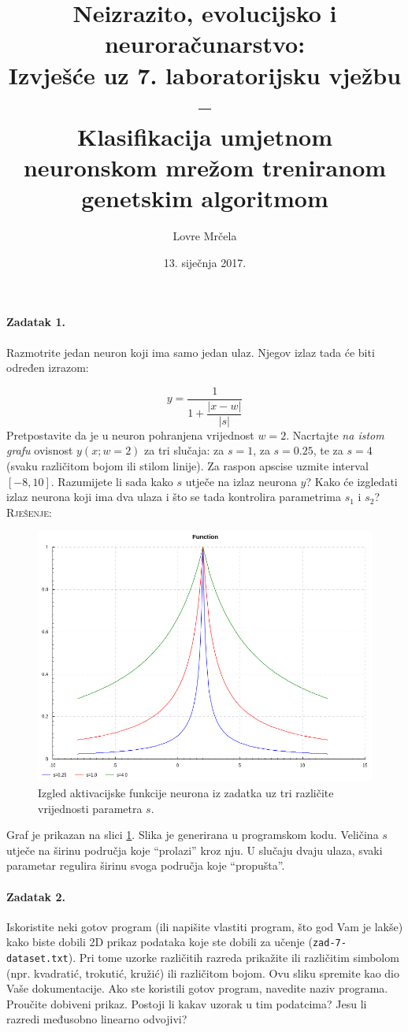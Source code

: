 \documentclass[12pt, a4paper]{article}
\title{Neizrazito, evolucijsko i neuroračunarstvo:\\
  Izvješće uz 7. laboratorijsku vježbu -- \\Klasifikacija umjetnom neuronskom mrežom treniranom genetskim algoritmom}
\author{Lovre Mrčela}
\date{13. siječnja 2017.}
\begin{document}
\maketitle

\paragraph{Zadatak 1.}
Razmotrite jedan neuron koji ima samo jedan ulaz.
Njegov izlaz tada će biti određen izrazom:

$$ y= \dfrac{1}{1 + \dfrac{|x - w|}{|s|}}$$
Pretpostavite da je u neuron pohranjena vrijednost $w=2$. Nacrtajte \textit{na istom grafu} ovisnost $y(x; w=2)$ za tri slučaja: za $s=1$, za $s=0.25$, te za $s=4$ (svaku različitom bojom ili stilom linije). Za raspon apscise uzmite interval $[-8, 10]$. Razumijete li sada kako $s$ utječe na izlaz neurona $y$? Kako će izgledati izlaz neurona koji ima dva ulaza i što se tada kontrolira parametrima $s_1$ i $s_2$?\\

\noindent\textsc{Rješenje:}
\begin{figure}[p]
  \centering
  \includegraphics[width=0.8\linewidth]{function.png}
  \caption{Izgled aktivacijske funkcije neurona iz zadatka uz tri različite vrijednosti parametra $s$.}
  \label{fig:function}
\end{figure}
Graf je prikazan na slici \ref{fig:function}.
Slika je generirana u programskom kodu.
Veličina $s$ utječe na širinu područja koje ``prolazi'' kroz nju.
U slučaju dvaju ulaza, svaki parametar regulira širinu svoga područja koje ``propušta''.

\paragraph{Zadatak 2.}
Iskoristite neki gotov program (ili napišite vlastiti program, što god Vam je lakše) kako biste dobili 2D prikaz podataka koje ste dobili za učenje (\texttt{zad-7-dataset.txt}).
Pri tome uzorke različitih razreda prikažite ili različitim simbolom (npr. kvadratić, trokutić, kružić) ili različitom bojom.
Ovu sliku spremite kao dio Vaše dokumentacije.
Ako ste koristili gotov program, navedite naziv programa.
Proučite dobiveni prikaz. Postoji li kakav uzorak u tim podatcima?
Jesu li razredi međusobno linearno odvojivi?\\
\end{document}
